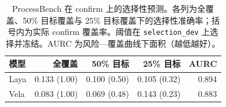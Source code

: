 \begin{table}[t]
\centering
\small
\caption{ProcessBench 在 confirm 上的选择性预测。各列为全覆盖、50\% 目标覆盖与
25\% 目标覆盖下的选择性准确率；括号内为实际 confirm 覆盖率。阈值在
\texttt{selection\_dev} 上选择并冻结。AURC 为风险—覆盖曲线下面积（越低越好）。}
\label{tab:processbench}
\begin{tabular}{@{}lrrrr@{}}
\toprule
模型 & 全覆盖 & 50\% 目标 & 25\% 目标 & AURC \\
\midrule
Laya & 0.133 (1.00) & 0.100 (0.50) & 0.105 (0.32) & 0.894 \\
Vela & 0.083 (1.00) & 0.069 (0.48) & 0.143 (0.23) & 0.883 \\
\bottomrule
\end{tabular}
\end{table}
